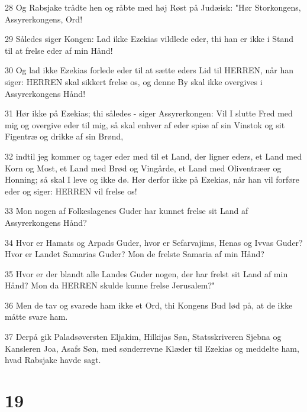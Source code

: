 \par 28 Og Rabsjake trådte hen og råbte med høj Røst på Judæisk: "Hør Storkongens, Assyrerkongens, Ord!
\par 29 Således siger Kongen: Lad ikke Ezekias vildlede eder, thi han er ikke i Stand til at frelse eder af min Hånd!
\par 30 Og lad ikke Ezekias forlede eder til at sætte eders Lid til HERREN, når han siger: HERREN skal sikkert frelse os, og denne By skal ikke overgives i Assyrerkongens Hånd!
\par 31 Hør ikke på Ezekias; thi således - siger Assyrerkongen: Vil I slutte Fred med mig og overgive eder til mig, så skal enhver af eder spise af sin Vinstok og sit Figentræ og drikke af sin Brønd,
\par 32 indtil jeg kommer og tager eder med til et Land, der ligner eders, et Land med Korn og Most, et Land med Brød og Vingårde, et Land med Oliventræer og Honning; så skal I leve og ikke dø. Hør derfor ikke på Ezekias, når han vil forføre eder og siger: HERREN vil frelse os!
\par 33 Mon nogen af Folkeslagenes Guder har kunnet frelse sit Land af Assyrerkongens Hånd?
\par 34 Hvor er Hamats og Arpads Guder, hvor er Sefarvajims, Henas og Ivvas Guder? Hvor er Landet Samarias Guder? Mon de frelste Samaria af min Hånd?
\par 35 Hvor er der blandt alle Landes Guder nogen, der har frelst sit Land af min Hånd? Mon da HERREN skulde kunne frelse Jerusalem?"
\par 36 Men de tav og svarede ham ikke et Ord, thi Kongens Bud lød på, at de ikke måtte svare ham.
\par 37 Derpå gik Paladsøversten Eljakim, Hilkijas Søn, Statsskriveren Sjebna og Kansleren Joa, Asafs Søn, med sønderrevne Klæder til Ezekias og meddelte ham, hvad Rabsjake havde sagt.

\chapter{19}

